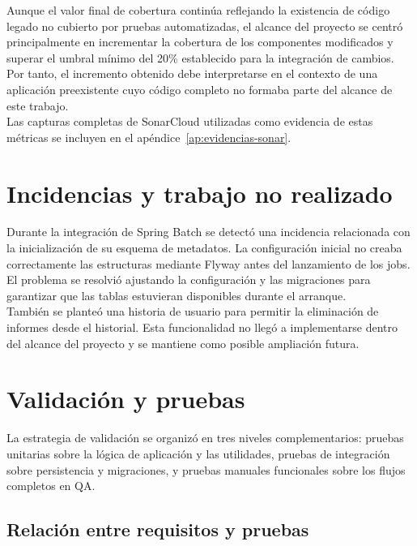 \documentclass[11pt,a4paper,titlepage,oneside]{report}
\begin{document}
Aunque el valor final de cobertura continúa reflejando la existencia de
código legado no cubierto por pruebas automatizadas, el alcance del proyecto
se centró principalmente en incrementar la cobertura de los componentes
modificados y superar el umbral mínimo del 20\% establecido para la
integración de cambios. Por tanto, el incremento obtenido debe interpretarse
en el contexto de una aplicación preexistente cuyo código completo no formaba
parte del alcance de este trabajo.\\

Las capturas completas de SonarCloud utilizadas como evidencia de estas
métricas se incluyen en el apéndice~\ref{ap:evidencias-sonar}.

\section{Incidencias y trabajo no realizado}

Durante la integración de Spring Batch se detectó una incidencia relacionada
con la inicialización de su esquema de metadatos. La configuración inicial no
creaba correctamente las estructuras mediante Flyway antes del lanzamiento de
los jobs. El problema se resolvió ajustando la configuración y las migraciones
para garantizar que las tablas estuvieran disponibles durante el arranque. \\

También se planteó una historia de usuario para permitir la eliminación de
informes desde el historial. Esta funcionalidad no llegó a implementarse dentro
del alcance del proyecto y se mantiene como posible ampliación futura.

\section{Validación y pruebas}

La estrategia de validación se organizó en tres niveles complementarios:
pruebas unitarias sobre la lógica de aplicación y las utilidades, pruebas de
integración sobre persistencia y migraciones, y pruebas manuales funcionales
sobre los flujos completos en QA.

\subsection{Relación entre requisitos y pruebas}
\end{document}
